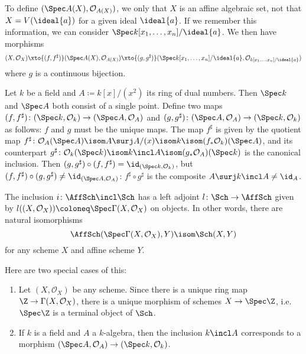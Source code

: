 \documentclass[wip, algebra]{bsteffan-lecturenotes}
\newcommand{\cO}{\mathcal{O}}
\begin{document}
\begin{remark}
	To define $(\Spec A(X), \cO_{A(X)})$, we only that $X$ is an affine algebraic set, not that $X = V(\ideal{a})$ for a given ideal $\ideal{a}$.
	If we remember this information, we can consider $\Spec k[x_1, \ldots, x_n] / \ideal{a}$.
	We then have morphisms
	\begin{equation*}
		(X, \cO_X) \xto{(f, f^\sharp)} (\Spec A(X), \cO_{A(X)}) \xto{(g, g^\sharp)} (\Spec k[x_1, \ldots, x_n] / \ideal{a}, \cO_{k[x_1, \ldots, x_n] / \ideal{a}})
	\end{equation*}
	where $g$ is a continuous bijection.
\end{remark}
\begin{example}
	Let $k$ be a field and $A \coloneq k[x] / (x^2)$ its ring of dual numbers.
	Then $\Spec k$ and $\Spec A$ both consist of a single point.
	Define two maps $(f, f^\sharp)\colon (\Spec k, \cO_{k}) \to (\Spec A, \cO_{A})$ and $(g, g^\sharp)\colon (\Spec A, \cO_{A}) \to (\Spec k, \cO_k)$ as follows:
	$f$ and $g$ must be the unique maps. 
	The map $f^\sharp$ is given by the quotient map $f^\sharp\colon \cO_A(\Spec A) \isom A \surj A / (x) \isom k \isom (f_* \cO_k)(\Spec A)$, and its counterpart $g^\sharp\colon \cO_k(\Spec k) \isom k \incl A \isom (g_* \cO_A)(\Spec k)$ is the canonical inclusion.
	Then $(g, g^\sharp) \circ (f, f^\sharp) = \id_{(\Spec k, \cO_k)}$, but $(f, f^\sharp) \circ (g, g^\sharp) \neq \id_{(\Spec A, \cO_A)}$: $f^\sharp \circ g^\sharp$ is the composite $A \surj k \incl A \neq \id_A$.
\end{example}
\begin{proposition}\label{prp:affinclleftadj}
	The inclusion $i\colon \AffSch \incl \Sch$ has a left adjoint $l\colon \Sch \to \AffSch$ given by $l((X, \cO_X)) \coloneq \Spec \Gamma(X, \cO_X)$ on objects.
	In other words, there are natural isomorphisms
	\begin{equation*}
		\AffSch(\Spec \Gamma(X, \cO_X), Y) \isom \Sch(X, Y)
	\end{equation*}
	for any scheme $X$ and affine scheme $Y$.
\end{proposition}
Here are two special cases of this:
\begin{example}
	\leavevmode
	\begin{enumerate}
		\item Let $(X, \cO_X)$ be any scheme.
			Since there is a unique ring map $\Z \to \Gamma(X, \cO_X)$, there is a unique morphism of schemes $X \to \Spec \Z$, i.e. $\Spec \Z$ is a terminal object of $\Sch$.
		\item If $k$ is a field and $A$ a $k$-algebra, then the inclusion $k \incl A$ corresponds to a morphism $(\Spec A, \cO_A) \to (\Spec k, \cO_k)$.
	\end{enumerate}
\end{example}
\end{document}
